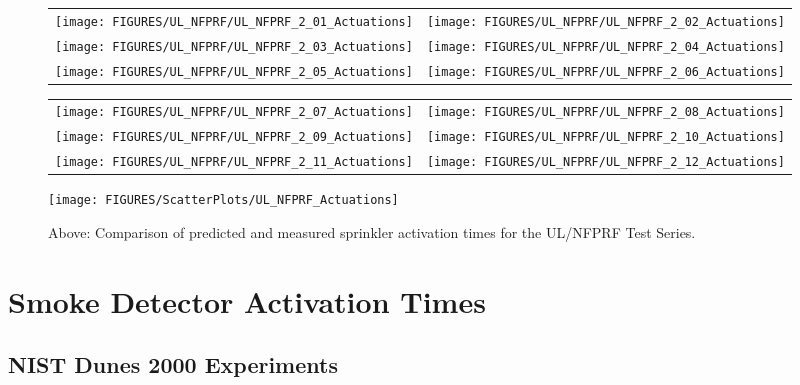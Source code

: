 \begin{figure}[p]
\begin{tabular*}{\textwidth}{l@{\extracolsep{\fill}}r}
\texttt{[image: FIGURES/UL\_NFPRF/UL\_NFPRF\_2\_01\_Actuations]} &
\texttt{[image: FIGURES/UL\_NFPRF/UL\_NFPRF\_2\_02\_Actuations]} \\
\texttt{[image: FIGURES/UL\_NFPRF/UL\_NFPRF\_2\_03\_Actuations]} &
\texttt{[image: FIGURES/UL\_NFPRF/UL\_NFPRF\_2\_04\_Actuations]} \\
\texttt{[image: FIGURES/UL\_NFPRF/UL\_NFPRF\_2\_05\_Actuations]} &
\texttt{[image: FIGURES/UL\_NFPRF/UL\_NFPRF\_2\_06\_Actuations]}
\end{tabular*}
\label{UL_NFPRF_2_1}
\end{figure}

\begin{figure}[p]
\begin{tabular*}{\textwidth}{l@{\extracolsep{\fill}}r}
\texttt{[image: FIGURES/UL\_NFPRF/UL\_NFPRF\_2\_07\_Actuations]} &
\texttt{[image: FIGURES/UL\_NFPRF/UL\_NFPRF\_2\_08\_Actuations]} \\
\texttt{[image: FIGURES/UL\_NFPRF/UL\_NFPRF\_2\_09\_Actuations]} &
\texttt{[image: FIGURES/UL\_NFPRF/UL\_NFPRF\_2\_10\_Actuations]} \\
\texttt{[image: FIGURES/UL\_NFPRF/UL\_NFPRF\_2\_11\_Actuations]} &
\texttt{[image: FIGURES/UL\_NFPRF/UL\_NFPRF\_2\_12\_Actuations]}
\end{tabular*}
\label{UL_NFPRF_2_2}
\end{figure}

\begin{figure}[p]
\begin{center}
\texttt{[image: FIGURES/ScatterPlots/UL\_NFPRF\_Actuations]}
\end{center}
\caption[Summary of sprinkler actuation predictions, UL/NFPRF Tests]
{Above: Comparison of predicted and measured sprinkler activation times for the UL/NFPRF Test Series.}
\label{UL_NFPRF}
\end{figure}




\clearpage

\section{Smoke Detector Activation Times}

\subsection{NIST Dunes 2000 Experiments}

